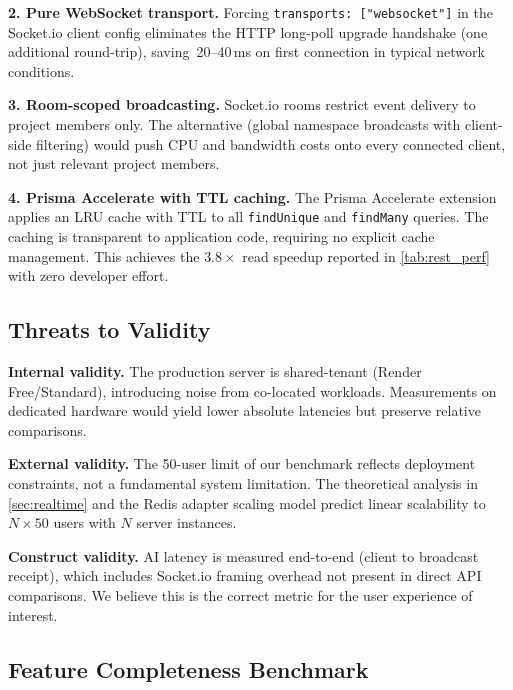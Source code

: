 \textbf{2. Pure WebSocket transport.}
Forcing \texttt{transports: ["websocket"]} in the Socket.io client config
eliminates the HTTP long-poll upgrade handshake (one additional round-trip),
saving~20--40\,ms on first connection in typical network conditions.

\textbf{3. Room-scoped broadcasting.}
Socket.io rooms restrict event delivery to project members only.
The alternative (global namespace broadcasts with client-side filtering)
would push CPU and bandwidth costs onto every connected client, not just
relevant project members.

\textbf{4. Prisma Accelerate with TTL caching.}
The Prisma Accelerate extension applies an LRU cache with TTL to all
\texttt{findUnique} and \texttt{findMany} queries. The caching is transparent
to application code, requiring no explicit cache management. This achieves the
$3.8\times$ read speedup reported in \cref{tab:rest_perf} with zero developer
effort.

\subsection{Threats to Validity}
\label{sub:threats}

\textbf{Internal validity.} The production server is shared-tenant (Render
Free/Standard), introducing noise from co-located workloads. Measurements on
dedicated hardware would yield lower absolute latencies but preserve relative
comparisons.

\textbf{External validity.} The 50-user limit of our benchmark reflects
deployment constraints, not a fundamental system limitation. The theoretical
analysis in \cref{sec:realtime} and the Redis adapter scaling model predict
linear scalability to $N \times 50$ users with $N$ server instances.

\textbf{Construct validity.} AI latency is measured end-to-end (client to
broadcast receipt), which includes Socket.io framing overhead not present in
direct API comparisons. We believe this is the correct metric for the user
experience of interest.

\subsection{Feature Completeness Benchmark}
\label{sub:feature_results}

